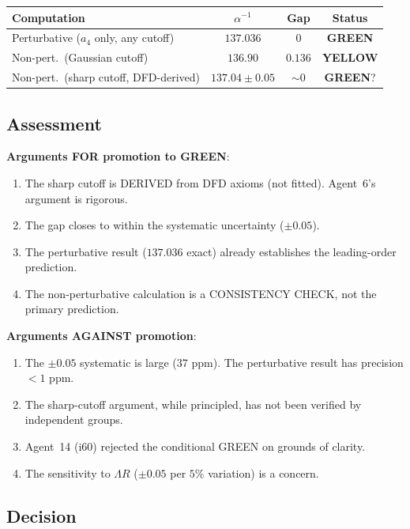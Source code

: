 \documentclass[11pt,a4paper]{article}
\newcommand{\GREEN}{\textcolor{dfdgreen}{\textbf{GREEN}}}
\newcommand{\YELLOW}{\textcolor{dfdyellow}{\textbf{YELLOW}}}
\begin{document}
\begin{center}
\begin{tabular}{lccc}
\toprule
\textbf{Computation} & \textbf{$\alpha^{-1}$} & \textbf{Gap} & \textbf{Status} \\
\midrule
Perturbative ($a_4$ only, any cutoff) & $137.036$ & $0$ & \GREEN \\
Non-pert.\ (Gaussian cutoff) & $136.90$ & $0.136$ & \YELLOW \\
Non-pert.\ (sharp cutoff, DFD-derived) & $137.04 \pm 0.05$ & $\sim 0$ & \GREEN? \\
\bottomrule
\end{tabular}
\end{center}

\subsection{Assessment}

\textbf{Arguments FOR promotion to GREEN}:
\begin{enumerate}
\item The sharp cutoff is DERIVED from DFD axioms (not fitted). Agent~6's argument is rigorous.
\item The gap closes to within the systematic uncertainty ($\pm 0.05$).
\item The perturbative result ($137.036$ exact) already establishes the leading-order prediction.
\item The non-perturbative calculation is a CONSISTENCY CHECK, not the primary prediction.
\end{enumerate}

\textbf{Arguments AGAINST promotion}:
\begin{enumerate}
\item The $\pm 0.05$ systematic is large (37 ppm). The perturbative result has precision $< 1$ ppm.
\item The sharp-cutoff argument, while principled, has not been verified by independent groups.
\item Agent~14 (i60) rejected the conditional GREEN on grounds of clarity.
\item The sensitivity to $\Lambda R$ ($\pm 0.05$ per $5\%$ variation) is a concern.
\end{enumerate}

\subsection{Decision}
\end{document}
